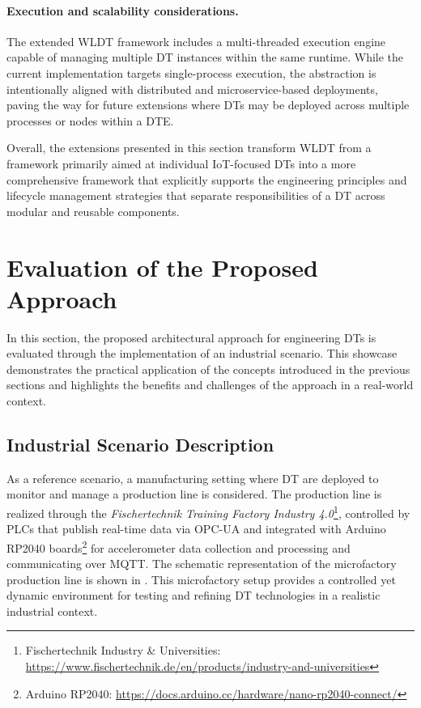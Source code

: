 \paragraph{Execution and scalability considerations.}
The extended WLDT framework includes a multi-threaded execution engine capable of managing multiple DT instances within the same runtime.
%
While the current implementation targets single-process execution, the abstraction is intentionally aligned with distributed and microservice-based deployments, paving the way for future extensions where DTs may be deployed across multiple processes or nodes within a \ac{DTE}.

\medskip
Overall, the extensions presented in this section transform WLDT from a framework primarily aimed at individual \ac{IoT}-focused \acp{DT} into a more comprehensive framework that explicitly supports the engineering principles and lifecycle management strategies that separate responsibilities of a \ac{DT} across modular and reusable components.

\section{Evaluation of the Proposed Approach}

In this section, the proposed architectural approach for engineering \acp{DT} is evaluated through the implementation of an industrial scenario.
%
This showcase demonstrates the practical application of the concepts introduced in the previous sections and highlights the benefits and challenges of the approach in a real-world context.

\subsection{Industrial Scenario Description}
 \label{ssec:dte:dt-engineering:scenario}

As a reference scenario, a manufacturing setting where \ac{DT} are deployed to monitor and manage a production line is considered. 
%
The production line is realized through the \emph{Fischertechnik Training Factory Industry 4.0}\footnote{Fischertechnik Industry \& Universities: \url{https://www.fischertechnik.de/en/products/industry-and-universities}}, controlled by PLCs that publish real-time data via OPC-UA and integrated with Arduino RP2040 boards\footnote{Arduino RP2040: \url{https://docs.arduino.cc/hardware/nano-rp2040-connect/}} for accelerometer data collection and processing and communicating over MQTT.
The schematic representation of the microfactory production line is shown in .
This microfactory setup provides a controlled yet dynamic environment for testing and refining DT technologies in a realistic industrial context.


